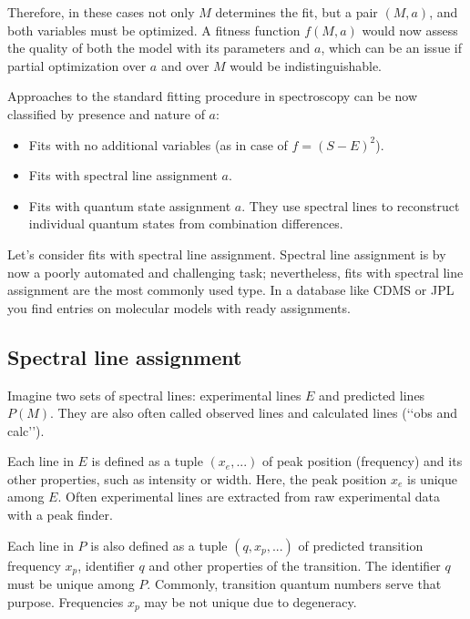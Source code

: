 \documentclass[11pt]{article}
\begin{document}
Therefore, in these cases not only $M$ determines the fit, but a pair $(M, a)$, and both variables must be optimized. A fitness function $f(M, a)$ would now assess the quality of both the model with its parameters and $a$, which can be an issue if partial optimization over $a$ and over $M$ would be indistinguishable. %

Approaches to the standard fitting procedure in spectroscopy can be now classified by presence and nature of $a$:
\begin{itemize}
	\item Fits with no additional variables (as in case of $f = (S - E)^2$). 
	\item Fits with spectral line assignment $a$.
	\item Fits with quantum state assignment $a$. They use spectral lines to reconstruct individual quantum states from combination differences.
\end{itemize}

Let's consider fits with spectral line assignment. Spectral line assignment is by now a poorly automated and challenging task; nevertheless, fits with spectral line assignment are the most commonly used type. In a database like CDMS or JPL you find entries on molecular models with ready assignments.

\subsection{Spectral line assignment}


Imagine two sets of spectral lines: experimental lines $E$ and predicted lines $P(M)$. They are also often called observed lines and calculated lines (\lq\lq{}obs and calc\rq\rq{}). 

Each  line in $E$ is defined as a tuple $(x_e, ...)$ of peak position (frequency) and its other properties, such as intensity or width. Here, the peak position $x_e$ is unique among $E$. Often experimental lines are extracted from raw experimental data with a peak finder.

Each line in $P$ is also defined as a tuple $(q, x_p, ...)$ of predicted transition frequency $x_p$, identifier $q$ and other properties of the transition. The identifier $q$ must be unique among $P$. Commonly, transition quantum numbers serve that purpose. Frequencies $x_p$ may be not unique due to degeneracy. 
\end{document}
